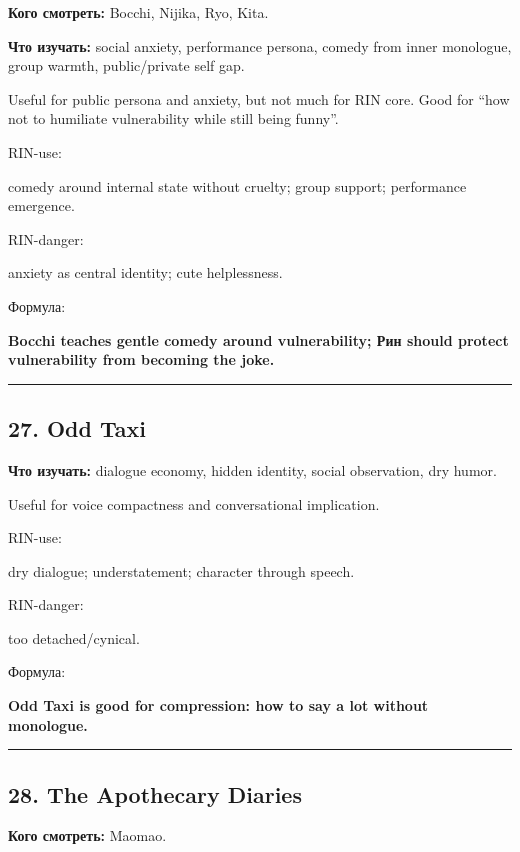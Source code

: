 \textbf{Кого смотреть:} Bocchi, Nijika, Ryo, Kita.

\textbf{Что изучать:} social anxiety, performance persona, comedy from
inner monologue, group warmth, public/\hspace{0pt}private self gap.

Useful for public persona and anxiety, but not much for RIN core. Good
for ``how not to humiliate vulnerability while still being funny''.

RIN-use:

comedy around internal state without cruelty; group support; performance
emergence.

RIN-danger:

anxiety as central identity; cute helplessness.

Формула:

\textbf{Bocchi teaches gentle comedy around vulnerability; Рин should
protect vulnerability from becoming the joke.}

\begin{center}\rule{0.5\linewidth}{0.5pt}\end{center}

\subsection*{27. Odd Taxi}

\textbf{Что изучать:} dialogue economy, hidden identity, social
observation, dry humor.

Useful for voice compactness and conversational implication.

RIN-use:

dry dialogue; understatement; character through speech.

RIN-danger:

too detached/\hspace{0pt}cynical.

Формула:

\textbf{Odd Taxi is good for compression: how to say a lot without
monologue.}

\begin{center}\rule{0.5\linewidth}{0.5pt}\end{center}

\subsection*{28. The Apothecary Diaries}

\textbf{Кого смотреть:} Maomao.


